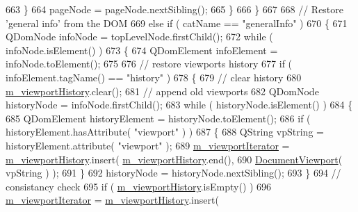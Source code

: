 \begin{DoxyCode}
663                 \}
664                 pageNode = pageNode.nextSibling();
665             \}
666         \}
667 
668         \textcolor{comment}{// Restore 'general info' from the DOM}
669         \textcolor{keywordflow}{else} \textcolor{keywordflow}{if} ( catName == \textcolor{stringliteral}{"generalInfo"} )
670         \{
671             QDomNode infoNode = topLevelNode.firstChild();
672             \textcolor{keywordflow}{while} ( infoNode.isElement() )
673             \{
674                 QDomElement infoElement = infoNode.toElement();
675 
676                 \textcolor{comment}{// restore viewports history}
677                 \textcolor{keywordflow}{if} ( infoElement.tagName() == \textcolor{stringliteral}{"history"} )
678                 \{
679                     \textcolor{comment}{// clear history}
680                     \hyperlink{classOkular_1_1DocumentPrivate_a47ead6a6650c01fb91ac512e55320f87}{m\_viewportHistory}.clear();
681                     \textcolor{comment}{// append old viewports}
682                     QDomNode historyNode = infoNode.firstChild();
683                     \textcolor{keywordflow}{while} ( historyNode.isElement() )
684                     \{
685                         QDomElement historyElement = historyNode.toElement();
686                         \textcolor{keywordflow}{if} ( historyElement.hasAttribute( \textcolor{stringliteral}{"viewport"} ) )
687                         \{
688                             QString vpString = historyElement.attribute( \textcolor{stringliteral}{"viewport"} );
689                             \hyperlink{classOkular_1_1DocumentPrivate_a81a62e8d31d0e7873cd5f5c1590fa2fc}{m\_viewportIterator} = 
      \hyperlink{classOkular_1_1DocumentPrivate_a47ead6a6650c01fb91ac512e55320f87}{m\_viewportHistory}.insert( \hyperlink{classOkular_1_1DocumentPrivate_a47ead6a6650c01fb91ac512e55320f87}{m\_viewportHistory}.end(),
690                                     \hyperlink{classOkular_1_1DocumentViewport}{DocumentViewport}( vpString ) );
691                         \}
692                         historyNode = historyNode.nextSibling();
693                     \}
694                     \textcolor{comment}{// consistancy check}
695                     \textcolor{keywordflow}{if} ( \hyperlink{classOkular_1_1DocumentPrivate_a47ead6a6650c01fb91ac512e55320f87}{m\_viewportHistory}.isEmpty() )
696                         \hyperlink{classOkular_1_1DocumentPrivate_a81a62e8d31d0e7873cd5f5c1590fa2fc}{m\_viewportIterator} = \hyperlink{classOkular_1_1DocumentPrivate_a47ead6a6650c01fb91ac512e55320f87}{m\_viewportHistory}.insert( 

\end{DoxyCode}
